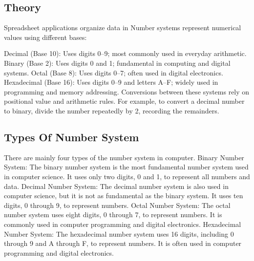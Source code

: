 \documentclass[a4paper,9pt]{article}
\begin{document}
\subsection{Theory}
Spreadsheet applications organize data in Number systems represent numerical values using different bases:

Decimal (Base 10): Uses digits 0–9; most commonly used in everyday arithmetic.
Binary (Base 2): Uses digits 0 and 1; fundamental in computing and digital systems.
Octal (Base 8): Uses digits 0–7; often used in digital electronics.
Hexadecimal (Base 16): Uses digits 0–9 and letters A–F; widely used in programming and memory addressing.
Conversions between these systems rely on positional value and arithmetic rules. For example, to convert a decimal number to binary, divide the number repeatedly by 2, recording the remainders.

\subsection{Types Of Number System}

There are mainly four types of the number system in computer. Binary Number System: The binary
number system is the most fundamental number system used in computer science. It uses only two digits,
0 and 1, to represent all numbers and data. Decimal Number System: The decimal number system is also
used in computer science, but it is not as fundamental as the binary system. It uses ten digits, 0 through 9, to
represent numbers. Octal Number System: The octal number system uses eight digits, 0 through 7, to represent
numbers. It is commonly used in computer programming and digital electronics. Hexadecimal Number System:
The hexadecimal number system uses 16 digits, including 0 through 9 and A through F, to represent numbers.
It is often used in computer programming and digital electronics.
\end{document}
